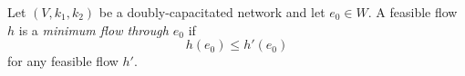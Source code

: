 Let $(V, k_1, k_2)$ be a doubly-capacitated network and let $e_0 \in W$. A feasible flow $h$ is a \textit{minimum flow through $e_0$} if
$$h(e_0) \leq h'(e_0)$$
for any feasible flow $h'$.
